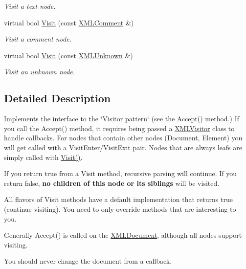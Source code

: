 \begin{DoxyCompactItemize}
\begin{DoxyCompactList}\small\item\em Visit a text node. \end{DoxyCompactList}\item 
virtual bool \hyperlink{classtinyxml2_1_1_x_m_l_visitor_acc8147fb5a85f6c65721654e427752d7}{Visit} (const \hyperlink{classtinyxml2_1_1_x_m_l_comment}{X\+M\+L\+Comment} \&)
\begin{DoxyCompactList}\small\item\em Visit a comment node. \end{DoxyCompactList}\item 
virtual bool \hyperlink{classtinyxml2_1_1_x_m_l_visitor_a14e4748387c34bf53d24e8119bb1f292}{Visit} (const \hyperlink{classtinyxml2_1_1_x_m_l_unknown}{X\+M\+L\+Unknown} \&)
\begin{DoxyCompactList}\small\item\em Visit an unknown node. \end{DoxyCompactList}\end{DoxyCompactItemize}


\subsection{Detailed Description}
Implements the interface to the \char`\"{}\+Visitor pattern\char`\"{} (see the Accept() method.) If you call the Accept() method, it requires being passed a \hyperlink{classtinyxml2_1_1_x_m_l_visitor}{X\+M\+L\+Visitor} class to handle callbacks. For nodes that contain other nodes (Document, Element) you will get called with a Visit\+Enter/\+Visit\+Exit pair. Nodes that are always leafs are simply called with \hyperlink{classtinyxml2_1_1_x_m_l_visitor_adc75bd459fc7ba8223b50f0616767f9a}{Visit()}.

If you return \textquotesingle{}true\textquotesingle{} from a Visit method, recursive parsing will continue. If you return false, {\bfseries no children of this node or its siblings} will be visited.

All flavors of Visit methods have a default implementation that returns \textquotesingle{}true\textquotesingle{} (continue visiting). You need to only override methods that are interesting to you.

Generally Accept() is called on the \hyperlink{classtinyxml2_1_1_x_m_l_document}{X\+M\+L\+Document}, although all nodes support visiting.

You should never change the document from a callback.

